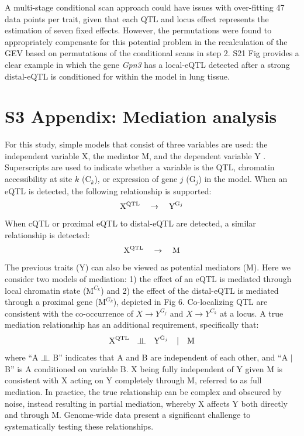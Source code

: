 \documentclass[10pt,letterpaper,twoside]{article}
\newcommand{\indep}{\rotatebox[origin=c]{90}{$\models$}}
\begin{document}
A multi-stage conditional scan approach could have issues with over-fitting 47 data points per trait, given that each $\text{QTL}$ and $\text{locus}$ effect represents the estimation of seven fixed effects. However, the permutations were found to appropriately compensate for this potential problem in the recalculation of the GEV based on permutations of the conditional scans in step 2. S21 Fig provides a clear example in which the gene \textit{Gpn3} has a local-eQTL detected after a strong distal-eQTL is conditioned for within the model in lung tissue. 

\newpage

\section*{S3 Appendix: Mediation analysis}

For this study, simple models that consist of three variables are used: the independent variable X, the mediator M, and the dependent variable Y \cite{Baron1986,MacKinnon2007}. Superscripts are used to indicate whether a variable is the QTL, chromatin accessibility at site $k$ ($\text{C}_{k}$), or expression of gene $j$ ($\text{G}_{j}$) in the model. When an eQTL is detected, the following relationship is supported:
\begin{equation}
\text{X}\textsuperscript{QTL} \quad \rightarrow \quad \text{Y}^{\text{G}_{j}}
\label{rel:eQTL}
\end{equation}
When cQTL or proximal eQTL to distal-eQTL are detected, a similar relationship is detected:
\begin{equation}
\text{X}\textsuperscript{QTL} \quad \rightarrow \quad \text{M}
\label{rel:cQTL}
\end{equation}
The previous traits (Y) can also be viewed as potential mediators (M). Here we consider two models of mediation: 1) the effect of an eQTL is mediated through local chromatin state ($\text{M}^{C_{k}}$) and 2) the effect of the distal-eQTL is mediated through a proximal gene ($\text{M}^{G_{k}}$), depicted in Fig 6. Co-localizing QTL are consistent with the co-occurrence of $X \rightarrow Y^{G_{j}}$ and $X \rightarrow Y^{C_{k}}$ at a locus. A true mediation relationship has an additional requirement, specifically that: 
\begin{equation}
\text{X}\textsuperscript{QTL} \quad \indep \quad \text{Y}^{\text{G}_{j}} \quad | \quad \text{M}
\label{rel:full_mediator}
\end{equation}
where ``A $\indep$ B'' indicates that A and B are independent of each other, and ``A $|$ B'' is A conditioned on variable B. X being fully independent of Y given M is consistent with X acting on Y completely through M, referred to as full mediation. In practice, the true relationship can be complex and obscured by noise, instead resulting in partial mediation, whereby X affects Y both directly and through M. Genome-wide data present a significant challenge to systematically testing these relationships.
\end{document}
